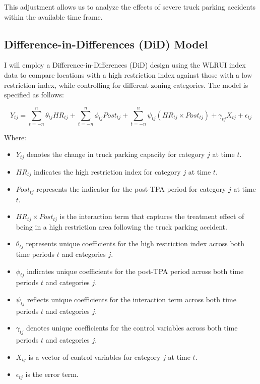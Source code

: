 \documentclass[
  12pt]{article}
\providecommand{\tightlist}{%
  \setlength{\itemsep}{0pt}\setlength{\parskip}{0pt}}\usepackage{longtable,booktabs,array}
\begin{document}
This adjustment allows us to analyze the effects of severe truck parking
accidents within the available time frame.

\hypertarget{difference-in-differences-did-model}{%
\subsection{Difference-in-Differences (DiD)
Model}\label{difference-in-differences-did-model}}

I will employ a Difference-in-Differences (DiD) design using the WLRUI
index data to compare locations with a high restriction index against
those with a low restriction index, while controlling for different
zoning categories. The model is specified as follows:

\[
Y_{tj} = \sum_{t=-n}^{n} \theta_{tj} HR_{tj} + \sum_{t=-n}^{n} \phi_{tj} Post_{tj} + \sum_{t=-n}^{n} \psi_{tj} (HR_{tj} \times Post_{tj}) + \gamma_{tj} X_{tj} + \epsilon_{tj}
\]

Where:

\begin{itemize}
\tightlist
\item
  \(Y_{tj}\) denotes the change in truck parking capacity for category
  \(j\) at time \(t\).
\item
  \(HR_{tj}\) indicates the high restriction index for category \(j\) at
  time \(t\).
\item
  \(Post_{tj}\) represents the indicator for the post-TPA period for
  category \(j\) at time \(t\).
\item
  \(HR_{tj} \times Post_{tj}\) is the interaction term that captures the
  treatment effect of being in a high restriction area following the
  truck parking accident.
\item
  \(\theta_{tj}\) represents unique coefficients for the high
  restriction index across both time periods \(t\) and categories \(j\).
\item
  \(\phi_{tj}\) indicates unique coefficients for the post-TPA period
  across both time periods \(t\) and categories \(j\).
\item
  \(\psi_{tj}\) reflects unique coefficients for the interaction term
  across both time periods \(t\) and categories \(j\).
\item
  \(\gamma_{tj}\) denotes unique coefficients for the control variables
  across both time periods \(t\) and categories \(j\).
\item
  \(X_{tj}\) is a vector of control variables for category \(j\) at time
  \(t\).
\item
  \(\epsilon_{tj}\) is the error term.
\end{itemize}
\end{document}
